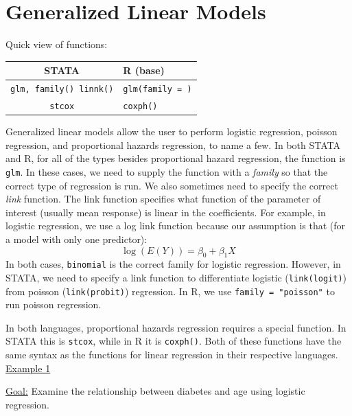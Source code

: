 \documentclass[landscape]{article}
\begin{document}
\section{Generalized Linear Models}
Quick view of functions:\\
\begin{tabular}{c|l}
STATA & R (base) \\
\hline
\texttt{glm, family() linnk()} & \texttt{glm(family = )}\\
\texttt{stcox} & \texttt{coxph()}
\end{tabular}

Generalized linear models allow the user to perform logistic regression, poisson regression, and proportional hazards regression, to name a few. In both STATA and R, for all of the types besides proportional hazard regression, the function is \texttt{glm}. In these cases, we need to supply the function with a \emph{family} so that the correct type of regression is run. We also sometimes need to specify the correct \emph{link} function. The link function specifies what function of the parameter of interest (usually mean response) is linear in the coefficients. For example, in logistic regression, we use a log link function because our assumption is that (for a model with only one predictor):
\begin{displaymath}
\log (E(Y)) = \beta_0 + \beta_1 X
\end{displaymath}
In both cases, \texttt{binomial} is the correct family for logistic regression. However, in STATA, we need to specify a link function to differentiate logistic (\texttt{link(logit)}) from poisson (\texttt{link(probit)}) regression. In R, we use \texttt{family = "poisson"} to run poisson regression.

In both languages, proportional hazards regression requires a special function. In STATA this is \texttt{stcox}, while in R it is \texttt{coxph()}. Both of these functions have the same syntax as the functions for linear regression in their respective languages. 
\newline
\noindent \underline{Example 1}

\underline{Goal:} Examine the relationship between diabetes and age using logistic regression.
\end{document}
